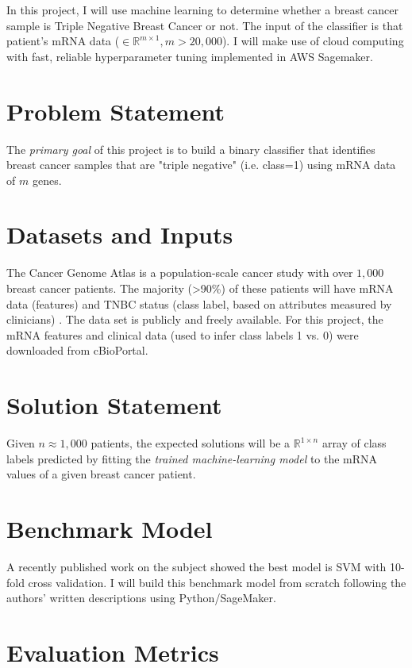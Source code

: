 \documentclass[11pt]{diazessay}
\begin{document}
In this project, I will use machine learning to determine whether a breast cancer sample is Triple Negative Breast Cancer or not. The input of the classifier is that patient's mRNA data ($\in \mathbb{R}^{m \times 1}, m > 20,000$).  I will make use of cloud computing with fast, reliable hyperparameter tuning implemented in AWS Sagemaker.

\section{Problem Statement}

The \textit{primary goal} of this project is to build a binary classifier that identifies breast cancer samples that are "triple negative" (i.e. class=1) using mRNA data of $m$ genes.

\section{Datasets and Inputs}

The Cancer Genome Atlas is a population-scale cancer study with  over $1,000$ breast cancer patients. The majority (>90\%) of these patients will have mRNA data (features) and TNBC status (class label, based on attributes measured by clinicians) \cite{tcga2012}. The data set is publicly and freely available. For this project, the mRNA features and clinical data (used to infer class labels 1 vs. 0)  were downloaded from cBioPortal.

\section{Solution Statement}

Given $n \approx 1,000$ patients, the expected solutions will be a $\mathbb{R}^{1 \times n}$ array of class labels predicted by fitting the \textit{trained machine-learning model} to the mRNA values of a given breast cancer patient.

\section{Benchmark Model}

A recently published work on the subject \cite{wu2021} showed the best model is SVM with 10-fold cross validation. I will build this benchmark model from scratch following the authors' written descriptions using Python/SageMaker.

\section{Evaluation Metrics}
\end{document}
